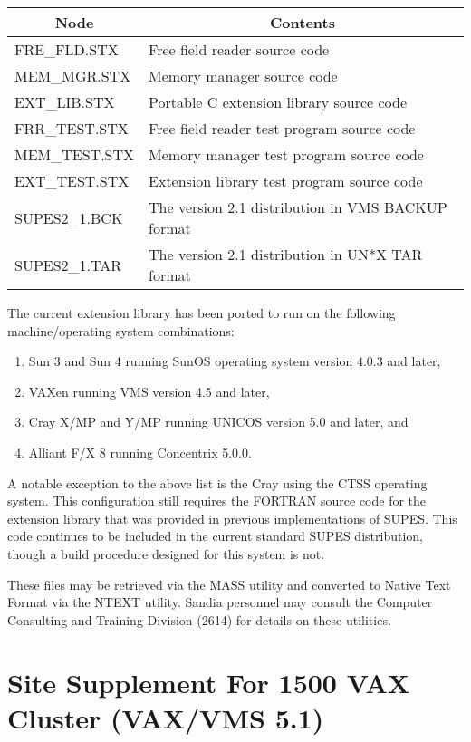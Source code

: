 \begin{tabular}{|ll|} \hline \hline
\multicolumn{1}{|c}{Node} & \multicolumn{1}{c|}{Contents} \\ \hline
FRE\_FLD.STX   &  Free field reader source code\\
MEM\_MGR.STX   &  Memory manager source code\\
EXT\_LIB.STX   &  Portable C extension library source code\\
FRR\_TEST.STX  &  Free field reader test program source code\\
MEM\_TEST.STX  &  Memory manager test program source code\\
EXT\_TEST.STX  &  Extension library test program source code\\
SUPES2\_1.BCK  &  The version 2.1 distribution in VMS BACKUP format\footnotemark%
\addtocounter{footnote}{-1}\\
SUPES2\_1.TAR  &  The version 2.1 distribution in UN*X TAR format\footnotemark%
\\ \hline
\hline
\end{tabular}
The current extension library has been ported
to run on the following machine/operating system combinations:
\begin{enumerate}
\item Sun 3 and Sun 4 running SunOS operating system version 4.0.3 and later,

\item VAXen running VMS version 4.5 and later,

\item Cray X/MP and Y/MP running UNICOS version 5.0 and later, and

\item Alliant F/X 8 running Concentrix 5.0.0.
\end{enumerate}
A notable exception to the above list is the Cray using the CTSS operating system.
This configuration still requires the FORTRAN source code for the extension
library that was provided in previous
implementations of SUPES.
This code continues to be included in the current standard SUPES distribution,
though a build procedure designed for this system is not.

These files may be retrieved via the MASS utility and converted to Native
Text Format via the NTEXT utility.  Sandia personnel may consult the
Computer Consulting and Training Division (2614) for details on these
utilities.

\section{Site Supplement For 1500 VAX Cluster (VAX/VMS 5.1)}

